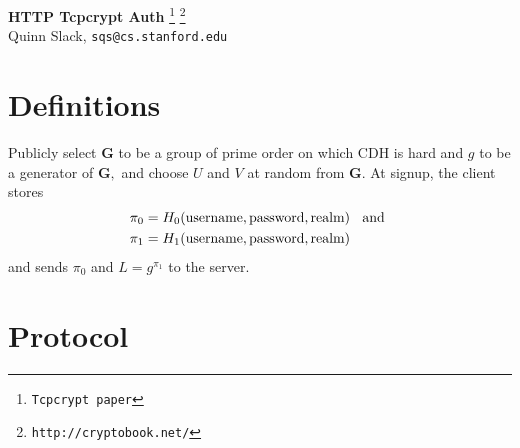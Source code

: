\documentclass[11pt]{article}
\begin{document}
\begin{center}
  \textsf{\textbf{\Large HTTP Tcpcrypt Auth}}
  \footnote{{\tt Tcpcrypt paper}}{}
  \footnote{{\tt http://cryptobook.net/}}{}\\
  Quinn Slack, {\tt sqs@cs.stanford.edu}
\end{center}

\section{Definitions}


Publicly select $\mathbf{G}$ to be a group of prime order on which CDH is hard and $g$ to be a generator of $\mathbf{G},$ and choose $U$ and $V$ at random from $\mathbf{G}.$ At signup, the client stores
\begin{align*}
\pi_0 &= H_0(\textrm{username}, \textrm{password}, \textrm{realm}) \textrm{ \;\;and } \\
\pi_1 &= H_1(\textrm{username}, \textrm{password}, \textrm{realm})
\end{align*}
and sends $\pi_0$ and $L=g^{\pi_1}$ to the server.\\



\section{Protocol}
\end{document}
